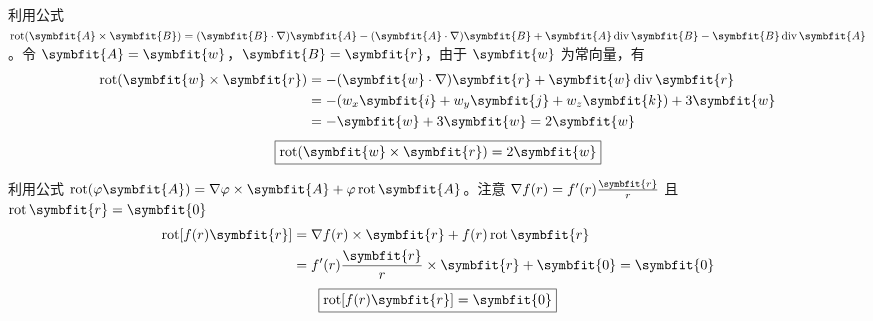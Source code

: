 \begin{solution}

    利用公式 $\operatorname{rot} (\symbfit{A} \times \symbfit{B}) = (\symbfit{B} \cdot \nabla) \symbfit{A} - (\symbfit{A} \cdot \nabla) \symbfit{B} + \symbfit{A} \operatorname{div} \symbfit{B} - \symbfit{B} \operatorname{div} \symbfit{A}$。令 $\symbfit{A} = \symbfit{w}$，$\symbfit{B} = \symbfit{r}$，由于 $\symbfit{w}$ 为常向量，有
    \begin{equation}
        \begin{aligned}
            \operatorname{rot} (\symbfit{w} \times \symbfit{r}) & = -(\symbfit{w} \cdot \nabla) \symbfit{r} + \symbfit{w} \operatorname{div} \symbfit{r} \\
                                                                        & = -(w_x \symbfit{i} + w_y \symbfit{j} + w_z \symbfit{k}) + 3\symbfit{w}                \\
                                                                        & = -\symbfit{w} + 3\symbfit{w} = 2\symbfit{w}
        \end{aligned}
    \end{equation}
    \begin{equation}
        \boxed{\operatorname{rot} (\symbfit{w} \times \symbfit{r}) = 2\symbfit{w}}
    \end{equation}


    利用公式 $\operatorname{rot} (\varphi \symbfit{A}) = \nabla \varphi \times \symbfit{A} + \varphi \operatorname{rot} \symbfit{A}$。注意 $\nabla f(r) = f'(r) \frac{\symbfit{r}}{r}$ 且 $\operatorname{rot} \symbfit{r} = \symbfit{0}$
    \begin{equation}
        \begin{aligned}
            \operatorname{rot} [f(r) \symbfit{r}] & = \nabla f(r) \times \symbfit{r} + f(r) \operatorname{rot} \symbfit{r} \\
                                                          & = f'(r) \frac{\symbfit{r}}{r} \times \symbfit{r} + \symbfit{0} = \symbfit{0}
        \end{aligned}
    \end{equation}
    \begin{equation}
        \boxed{\operatorname{rot} [f(r) \symbfit{r}] = \symbfit{0}}
    \end{equation}



\end{solution}
